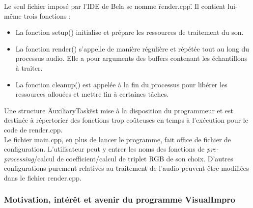 Le seul fichier imposé par l'IDE de Bela se nomme \"render.cpp\". Il
contient lui-même trois fonctions :
\begin{itemize}
 \item La fonction setup() initialise et prépare les ressources de
       traitement du son.
 \item La fonction render() s'appelle de manière régulière et répétée
       tout au long du processus audio. Elle a pour arguments des buffers
       contenant les échantillons à traiter.
 \item La fonction cleanup() est appelée à la fin du processus pour
       libérer les ressources allouées et mettre fin à certaines tâches.
\end{itemize}

Une structure \"AuxiliaryTask\" est mise à la disposition du
programmeur et est destinée à répertorier des fonctions trop coûteuses
en temps à l'exécution pour le code de render.cpp. \\

Le fichier main.cpp, en plus de lancer le programme, fait office de
fichier de configuration. L'utilisateur peut y entrer les noms des
fonctions de \textit{pre-processing}/calcul de coefficient/calcul de
triplet RGB de son choix. D'autres configurations purement relatives
au traitement de l'audio peuvent être modifiées dans le fichier
render.cpp.

\subsubsection{Motivation, intérêt et avenir du programme VisualImpro}
